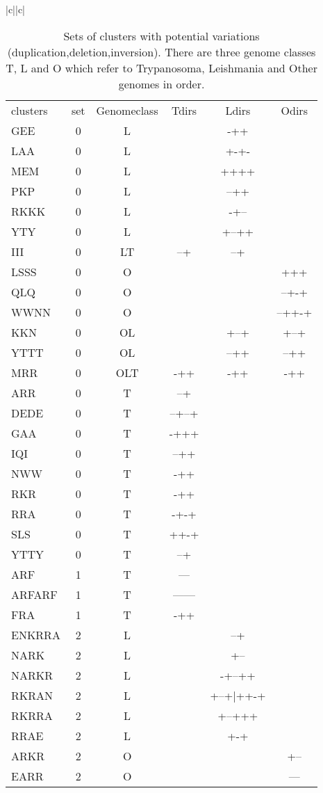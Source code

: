 \documentclass[table,
12pt, %
a4paper, %
oneside, %
headinclude,footinclude, %
BCOR5mm, %
]{scrartcl}
\begin{document}
\begin{table}[htbp]
\caption{Sets of clusters with potential variations (duplication,deletion,inversion). There are three genome classes T, L and O which refer to Trypanosoma, Leishmania and Other genomes in order. }
\begin{adjustbox}{totalheight=\textheight,center}
\begin{tabular}{|c||c|} \hline
\begin{tabular}{l ccccc}
clusters&set&Genomeclass&Tdirs&Ldirs&Odirs\\
\rowcolor{shadecolor}
GEE&0&L&&-++&\\
LAA&0&L&&+-+-&\\
MEM&0&L&&++++&\\
PKP&0&L&&--++&\\
RKKK&0&L&&-+--&\\
YTY&0&L&&+--++&\\
III&0&LT&--+&--+&\\
LSSS&0&O&&&+++\\
QLQ&0&O&&&--+-+\\
WWNN&0&O&&&--++-+\\
KKN&0&OL&&+--+&+--+\\
YTTT&0&OL&&--++&--++\\
MRR&0&OLT&-++&-++&-++\\
ARR&0&T&--+&&\\
DEDE&0&T&--+--+&&\\
GAA&0&T&-+++&&\\
IQI&0&T&--++&&\\
NWW&0&T&-++&&\\
RKR&0&T&-++&&\\
RRA&0&T&-+-+&&\\
SLS&0&T&++-+&&\\
YTTY&0&T&--+&&\\
\rowcolor{lightgray}
ARF&1&T&---&&\\
ARFARF&1&T&------&&\\
FRA&1&T&-++&&\\
\rowcolor{shadecolor}
ENKRRA&2&L&&--+&\\
NARK&2&L&&+--&\\
NARKR&2&L&&-+--++&\\
RKRAN&2&L&&+--+|++-+&\\
RKRRA&2&L&&+--+++&\\
RRAE&2&L&&+-+&\\
ARKR&2&O&&&+--\\
EARR&2&O&&&---\\

\end{tabular}
\end{tabular}
\end{adjustbox}
\end{table}
\end{document}
